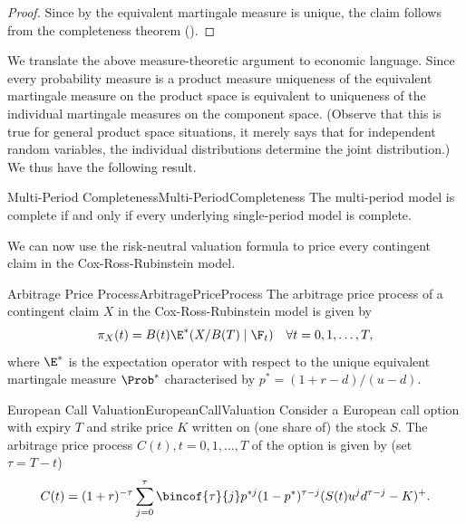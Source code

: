 \begin{proof}
	Since by  the equivalent martingale measure is unique, the claim follows from the completeness theorem ().
\end{proof}

We translate the above measure-theoretic argument to economic language. Since every probability measure is a product measure uniqueness of the equivalent martingale measure on the product space is equivalent to uniqueness of the individual martingale measures on the component space. (Observe that this is true for general product space situations, it merely says that for independent random variables, the individual distributions determine the joint distribution.) We thus have the following result.

\begin{cor}{Multi-Period Completeness}{Multi-PeriodCompleteness}
	The multi-period model is complete if and only if every underlying single-period model is complete.
\end{cor}

We can now use the risk-neutral valuation formula to price every contingent claim in the Cox-Ross-Rubinstein model.

\begin{prop}{Arbitrage Price Process}{ArbitragePriceProcess}
	The arbitrage price process of a contingent claim $X$ in the Cox-Ross-Rubinstein model is given by
	\[
		\pi_X(t) = B(t)\E^* (X/B(T) \mid \F_t) \quad \forall t = 0, 1, \dots, T,
	\]
	where $\E^*$ is the expectation operator with respect to the unique equivalent martingale measure $\Prob^*$ characterised by $p^* = (1+r-d)/(u-d)$.
\end{prop}

\begin{cor}{European Call Valuation}{EuropeanCallValuation}
	Consider a European call option with expiry $T$ and strike price $K$ written on (one share of) the stock $S$. The arbitrage price process $C(t), t=0,1,\dots,T$ of the option is given by (set $\tau = T-t$)
	\begin{equation} \label{eq:EuropeanCallValuation}
		C(t) = (1+r)^{-\tau} \sum_{j=0}^{\tau} \bincof{\tau}{j} p^{*j}(1-p^*)^{\tau-j}(S(t)u^j d^{\tau-j} - K)^+.
	\end{equation}
\end{cor}

